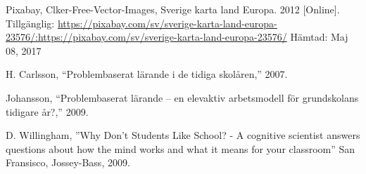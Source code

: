     Pixabay, Clker-Free-Vector-Images, Sverige karta land Europa. 2012 [Online]. Tillgänglig: \url{https://pixabay.com/sv/sverige-karta-land-europa-23576/:https://pixabay.com/sv/sverige-karta-land-europa-23576/} Hämtad: Maj 08, 2017
    
    H. Carlsson, “Problembaserat lärande i de tidiga skolåren,” 2007.
    
    Johansson, “Problembaserat lärande – en elevaktiv arbetsmodell för grundskolans tidigare år?,” 2009.
    
    D. Willingham, ''Why Don't Students Like School? - A cognitive scientist answers questions about how the mind works and what it means for your classroom'' 
    San Fransisco,
    Jossey-Bass, 
    2009. 